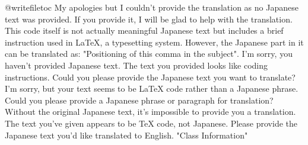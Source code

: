 \relax
\providecommand\hyper@newdestlabel[2]{}
@writefile{toc}{\protected@file@percent }
My apologies but I couldn't provide the translation as no Japanese text was provided. If you provide it, I will be glad to help with the translation.
This code itself is not actually meaningful Japanese text but includes a brief instruction used in LaTeX, a typesetting system. However, the Japanese part in it can be translated as: "Positioning of this comma in the subject".
I'm sorry, you haven't provided Japanese text. The text you provided looks like coding instructions. Could you please provide the Japanese text you want to translate?
I'm sorry, but your text seems to be LaTeX code rather than a Japanese phrase. Could you please provide a Japanese phrase or paragraph for translation?
Without the original Japanese text, it's impossible to provide you a translation. The text you've given appears to be TeX code, not Japanese. Please provide the Japanese text you'd like translated to English.
"Class Information"
